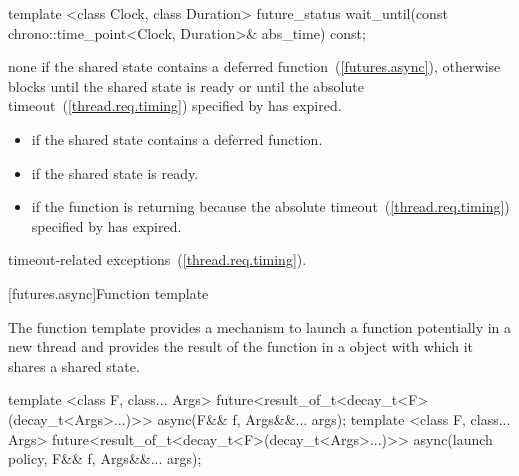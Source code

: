 %
%
\begin{itemdecl}
template <class Clock, class Duration>
  future_status wait_until(const chrono::time_point<Clock, Duration>& abs_time) const;
\end{itemdecl}

\begin{itemdescr}
\pnum
\effects
none if the shared state contains a deferred function~(\ref{futures.async}),
otherwise
blocks until the shared state is ready or until the
absolute timeout~(\ref{thread.req.timing}) specified by
 has expired.

\pnum
\returns

\begin{itemize}
\item {} if the shared state contains a deferred
function.

\item {} if the shared state is ready.

\item {} if the function is returning because the
absolute timeout~(\ref{thread.req.timing})
specified by  has expired.
\end{itemize}

\pnum
\throws
timeout-related exceptions~(\ref{thread.req.timing}).
\end{itemdescr}

[futures.async]{Function template }

\pnum
The function template  provides a mechanism to launch a function potentially
in a new thread and provides the result of the function in a  object with which
it shares a shared state.

%
\begin{itemdecl}
template <class F, class... Args>
  future<result_of_t<decay_t<F>(decay_t<Args>...)>> async(F&& f, Args&&... args);
template <class F, class... Args>
  future<result_of_t<decay_t<F>(decay_t<Args>...)>> async(launch policy, F&& f, Args&&... args);
\end{itemdecl}

